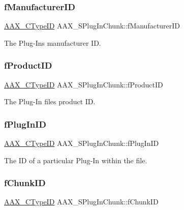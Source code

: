 \subsubsection{\texorpdfstring{fManufacturerID}{fManufacturerID}}
{\footnotesize\ttfamily \mbox{\hyperlink{a00392_ac678f9c1fbcc26315d209f71a147a175}{A\+A\+X\+\_\+\+C\+Type\+ID}} A\+A\+X\+\_\+\+S\+Plug\+In\+Chunk\+::f\+Manufacturer\+ID}



The Plug-\/\+In\textquotesingle{}s manufacturer ID. 

\mbox{\label{a01421_abfaa54962ff0b39cee02cffc777d0038}} 
\subsubsection{\texorpdfstring{fProductID}{fProductID}}
{\footnotesize\ttfamily \mbox{\hyperlink{a00392_ac678f9c1fbcc26315d209f71a147a175}{A\+A\+X\+\_\+\+C\+Type\+ID}} A\+A\+X\+\_\+\+S\+Plug\+In\+Chunk\+::f\+Product\+ID}



The Plug-\/\+In file\textquotesingle{}s product ID. 

\mbox{\label{a01421_af3d433e0a0c022cf84f1cc7dc4862bda}} 
\subsubsection{\texorpdfstring{fPlugInID}{fPlugInID}}
{\footnotesize\ttfamily \mbox{\hyperlink{a00392_ac678f9c1fbcc26315d209f71a147a175}{A\+A\+X\+\_\+\+C\+Type\+ID}} A\+A\+X\+\_\+\+S\+Plug\+In\+Chunk\+::f\+Plug\+In\+ID}



The ID of a particular Plug-\/\+In within the file. 

\mbox{\label{a01421_a061e99935a8e743891c4051f1a6ecba2}} 
\subsubsection{\texorpdfstring{fChunkID}{fChunkID}}
{\footnotesize\ttfamily \mbox{\hyperlink{a00392_ac678f9c1fbcc26315d209f71a147a175}{A\+A\+X\+\_\+\+C\+Type\+ID}} A\+A\+X\+\_\+\+S\+Plug\+In\+Chunk\+::f\+Chunk\+ID}




